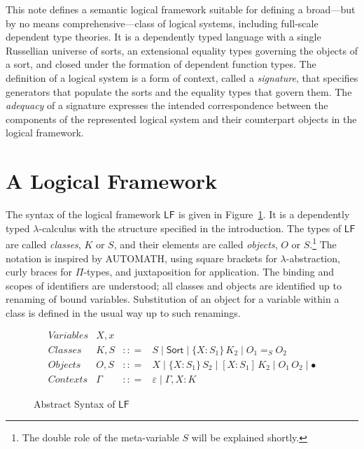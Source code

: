 \documentclass[11pt,twoside]{article}
\newcommand{\braces}[1]{\{#1\}}
\newcommand{\bracks}[1]{[#1]}
\newcommand{\LF}[1][]{\ensuremath{\mathsf{LF}_{#1}}}
\newcommand{\bnfdef}{\mathrel{{:}{:}{=}}}
\newcommand{\bnfalt}{\mathrel{\mid}}
\newcommand{\sortclass}{\ensuremath{\textsf{Sort}}}
\newcommand{\eqclass}[3]{{#2}=_{#1}{#3}}
\newcommand{\piclass}[3]{\braces{{#2}\mathbin{:}{#1}}\,{#3}}
\newcommand{\pisort}[3]{\piclass{#1}{#2}{#3}}
\newcommand{\lamobj}[3]{\bracks{{#2}\mathbin{:}{#1}}\,{#3}}
\newcommand{\appobj}[2]{{#1}\,{#2}}
\newcommand{\selfobj}{\bullet}
\newcommand{\empctx}{\varepsilon}
\newcommand{\snocctx}[3]{{#1}\mathbin{,}{#2}{:}{#3}}
\begin{document}
This note defines a semantic logical framework suitable for defining a broad---but by no
means comprehensive---class of logical systems, including full-scale dependent type
theories.  It is a dependently typed language with a single Russellian universe of sorts,
an extensional equality types governing the objects of a sort, and closed under the
formation of dependent function types.  The definition of a logical system is a form of
context, called a \emph{signature}, that specifies generators that populate the sorts and
the equality types that govern them.  The \emph{adequacy} of a signature expresses the
intended correspondence between the components of the represented logical system and their
counterpart objects in the logical framework.

\section{A Logical Framework}

The syntax of the logical framework \LF{} is given in Figure~\ref{fig:lf-syntax}.  It is a
dependently typed $\lambda$-calculus with the structure specified in the introduction.
The types of \LF{} are called \emph{classes}, $K$ or $S$, and their elements are called
\emph{objects}, $O$ or $S$.\footnote{The double role of the meta-variable $S$ will be
  explained shortly.}  The notation is inspired by \textsf{AUTOMATH}, using square
brackets for $\lambda$-abstraction, curly braces for $\Pi$-types, and juxtaposition for
application.  The binding and scopes of identifiers are understood; all classes and
objects are identified up to renaming of bound variables.  Substitution of an object for a
variable within a class is defined in the usual way up to such renamings.

\begin{figure}[tp]
  
  \begin{displaymath}
    \begin{array}{lrcl}
      \textit{Variables} & X,x \\
      \textit{Classes} & K, S & \bnfdef{} & S \bnfalt \sortclass \bnfalt \piclass{S_{1}}{X}{K_{2}}
                                          \bnfalt \eqclass{S}{O_{1}}{O_{2}} \\
      \textit{Objects} & O, S & \bnfdef & X \bnfalt \pisort{S_{1}}{X}{S_{2}} \bnfalt \lamobj{S_{1}}{X}{K_{2}} \bnfalt
                                          \appobj{O_{1}}{O_{2}} \bnfalt \selfobj{} \\
      \textit{Contexts} & \Gamma & \bnfdef & \empctx{} \bnfalt \snocctx{\Gamma}{X}{K}
    \end{array}
  \end{displaymath}

  \caption{Abstract Syntax of \LF{}}
  \label{fig:lf-syntax}
\end{figure}
\end{document}

